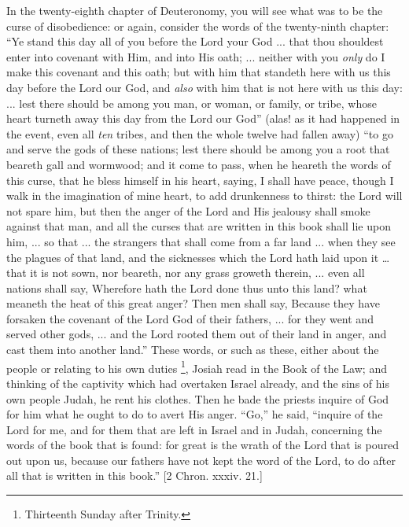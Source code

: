 In the twenty-eighth chapter of Deuteronomy, you will see what was
to be the curse of disobedience: or again, consider the words of the
twenty-ninth chapter: ``Ye stand this day all of you before the
Lord your God ... that thou shouldest enter into covenant with Him,
and into His oath; ... neither with you \emph{only} do I make this
covenant and this oath; but with him that standeth here with us this
day before the Lord our God, and \emph{also} with him that is not here
with us this day: ... lest there should be among you man, or woman, or
family, or tribe, whose heart turneth away this day from the Lord our
God'' (alas! as it had happened in the event, even all \emph{ten}
tribes, and then the whole twelve had fallen away) ``to go and
serve the gods of these nations; lest there should be among you a root
that beareth gall and wormwood; and it come to pass, when he heareth
the words of this curse, that he bless himself in his heart, saying, I
shall have peace, though I walk in the imagination of mine heart, to
add drunkenness to thirst: the Lord will not spare him, but then the
anger of the Lord and His jealousy shall smoke against that man, and
all the curses that are written in this book shall lie upon him, ...
so that ... the strangers that shall come from a far land ... when
they see the plagues of that land, and the sicknesses which the Lord
hath laid upon it … that it is not sown, nor beareth, nor any grass
groweth therein, ... even all nations shall say, Wherefore hath the
Lord done thus unto this land? what meaneth the heat of this great
anger? Then men shall say, Because they have forsaken the covenant of
the Lord God of their fathers, ... for they went and served other
gods, ... and the Lord rooted them out of their land in anger, and
cast them into another land.'' These words, or such as these,
either about the people or relating to his own duties \footnote{Thirteenth Sunday after Trinity.},
Josiah read in the Book of the Law; and thinking of the captivity
which had overtaken Israel already, and the sins of his own people
Judah, he rent his clothes. Then he bade the priests inquire of God
for him what he ought to do to avert His anger. ``Go,'' he
said, ``inquire of the Lord for me, and for them that are left in
Israel and in Judah, concerning the words of the book that is found:
for great is the wrath of the Lord that is poured out upon us, because our fathers have not kept the word of the Lord, to do after
all that is written in this book.'' [2 Chron. xxxiv. 21.]

